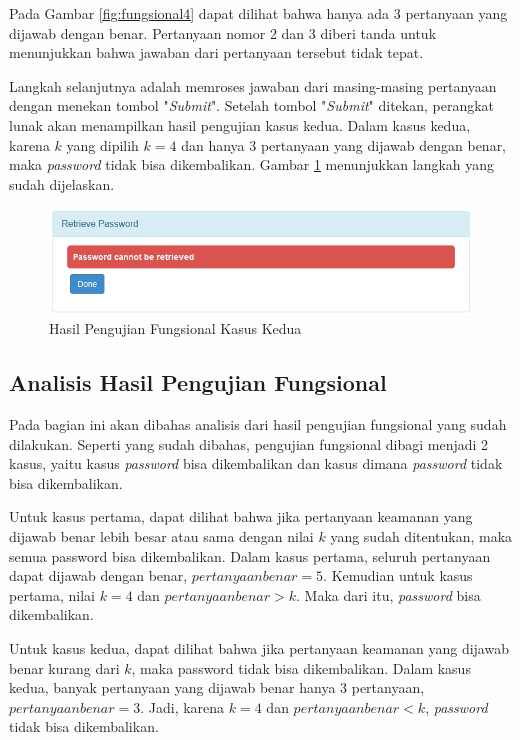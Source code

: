 Pada Gambar \ref{fig:fungsional4} dapat dilihat bahwa hanya ada 3 pertanyaan yang dijawab dengan benar. Pertanyaan nomor 2 dan 3 diberi tanda untuk menunjukkan bahwa jawaban dari pertanyaan tersebut tidak tepat.

Langkah selanjutnya adalah memroses jawaban dari masing-masing pertanyaan dengan menekan tombol "\textit{Submit}". Setelah tombol "\textit{Submit}" ditekan, perangkat lunak akan menampilkan hasil pengujian kasus kedua. Dalam kasus kedua, karena $k$ yang dipilih $k=4$ dan hanya 3 pertanyaan yang dijawab dengan benar, maka \textit{password} tidak bisa dikembalikan. Gambar \ref{fig:fungsional5} menunjukkan langkah yang sudah dijelaskan.

\begin{figure}[H]
	\includegraphics[scale=0.7]{Gambar/fungsional5}
	\centering
	\caption{Hasil Pengujian Fungsional Kasus Kedua}\label{fig:fungsional5}
\end{figure}

\subsection{Analisis Hasil Pengujian Fungsional}

Pada bagian ini akan dibahas analisis dari hasil pengujian fungsional yang sudah dilakukan. Seperti yang sudah dibahas, pengujian fungsional dibagi menjadi 2 kasus, yaitu kasus \textit{password} bisa dikembalikan dan kasus dimana \textit{password} tidak bisa dikembalikan.

Untuk kasus pertama, dapat dilihat bahwa jika pertanyaan keamanan yang dijawab benar lebih besar atau sama dengan nilai $k$ yang sudah ditentukan, maka semua password bisa dikembalikan. Dalam kasus pertama, seluruh pertanyaan dapat dijawab dengan benar, $pertanyaan benar = 5$. Kemudian untuk kasus pertama, nilai $k=4$ dan $pertanyaan benar > k$. Maka dari itu, \textit{password} bisa dikembalikan.

Untuk kasus kedua, dapat dilihat bahwa jika pertanyaan keamanan yang dijawab benar kurang dari $k$, maka password tidak bisa dikembalikan. Dalam kasus kedua, banyak pertanyaan yang dijawab benar hanya 3 pertanyaan, $pertanyaan benar=3$. Jadi, karena $k=4$ dan $pertanyaan benar < k$, \textit{password} tidak bisa dikembalikan.

